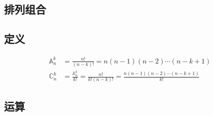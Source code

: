 \begin{center}\section{ 排列组合}\end{center}
\subsection{定义}
\begin{align}
\mathbb{A}_n^k &= \frac{n!}{(n-k)!}=n(n-1)(n-2)\cdots(n-k+1) \\
\mathbb{C}_n^k &= \frac{\mathbb{A}_n^k}{k!} = \frac{n!}{k!(n-k)!}=\frac{n(n-1)(n-2)\cdots(n-k+1)}{k!}
\end{align}
\subsection{运算}
